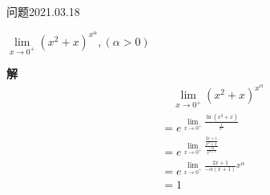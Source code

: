 \begin{mybox}{问题2021.03.18}
	
	\qquad $\lim\limits_{x \to 0^+}(x^2+x)^{x^\alpha},(\alpha >0)$
\end{mybox}
\noindent
\textbf{解}
\begin{align*}
	&\quad\lim\limits_{x \to 0^+}(x^2+x)^{x^\alpha}\\
	&=e^{\lim\limits_{x \to 0^+} \frac{\ln (x^2+x)}{\frac{1}{x^\alpha}}}\\
	&=e^{\lim\limits_{x \to 0^+} \frac{\frac{2x+1}{x^2+x}}{\frac{-\alpha}{x^{\alpha+1}}}}\\
	&=e^{\lim\limits_{x \to 0^+} \frac{2x+1}{-\alpha(x+1)}x^\alpha}\\
	&=1
\end{align*}
